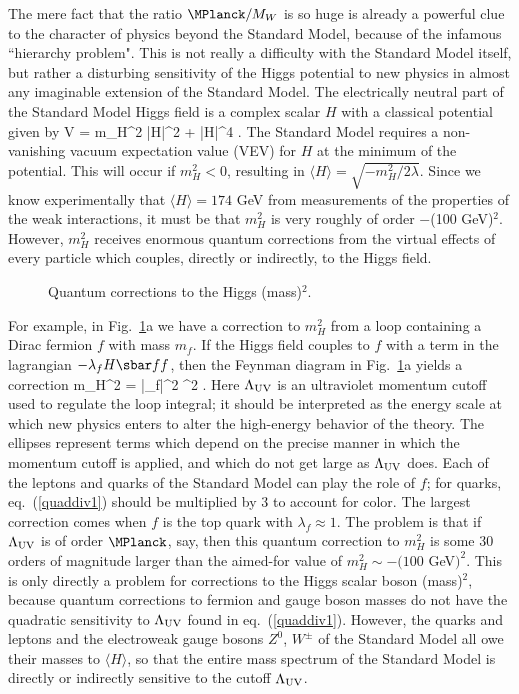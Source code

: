 The mere fact that the ratio $\MPlanck/M_W$ is so huge is
already a
powerful clue
to the
character of physics beyond the Standard Model, because of the infamous
``hierarchy problem".\cite{hierarchyproblem}
This is not really a difficulty
with the Standard Model itself, but rather a disturbing
sensitivity of the Higgs potential to new physics
in almost any imaginable extension of the Standard Model.
The electrically neutral part of the Standard Model Higgs field
is a complex scalar $H$ with a classical potential given by
\beq
V = m_H^2 |H|^2 + {\lambda} |H|^4\> .
\label{higgspotential}
\eeq
The Standard Model requires a non-vanishing vacuum expectation value
(VEV) for $H$
at the minimum of the potential.
This will occur if $m_H^2 < 0$, resulting in $\langle H \rangle
= \sqrt{-m_H^2/2\lambda}$. Since we know experimentally that
$\langle H \rangle 
= 174$ GeV from measurements of the properties of the weak interactions,
it must be that $m_H^2$ is very roughly of order $-$(100 GeV)$^2$.
However,
$m_H^2$ receives enormous quantum corrections from the virtual effects
of every particle which couples, directly or indirectly, to the Higgs field.

\begin{figure}
\centerline{}
\caption{Quantum corrections to the Higgs (mass)$^2$.
\label{fig:higgscorr1}}
\end{figure}
For example, in Fig.~\ref{fig:higgscorr1}a
we have a correction to $m_H^2$ from
a loop containing a Dirac fermion $f$ with mass $m_f$. If
the Higgs field couples to $f$
with a term in the lagrangian $-\lambda_f H \sbar f f$,
then the Feynman diagram in Fig.~\ref{fig:higgscorr1}a  yields a
correction
\beq
\Delta m_H^2 =  {|\lambda_f|^2 \pi^2}
.
\label{quaddiv1}
\eeq
Here $\Lambda_{\rm UV}$ is an ultraviolet
momentum cutoff used to regulate the
loop integral; it should be interpreted
as the energy scale at which new physics
enters to alter the high-energy behavior of the theory.
The ellipses represent terms which depend on the precise manner in which
the momentum cutoff is applied, and which do
not get large as $\Lambda_{\rm UV}$ does.
Each of the leptons and quarks of the
Standard Model can play the role of $f$; for quarks, eq.~(\ref{quaddiv1})
should be multiplied by 3 to account for color.
The largest correction comes when $f$ is the top quark
with $\lambda_f\approx 1$. The problem is that if $\Lambda_{\rm UV}$
is of order $\MPlanck$, say, then this quantum correction to $m_H^2$
is some 30 orders of magnitude larger than the aimed-for value of
$m_H^2 \sim -(100$ GeV$)^2$.
This is only directly a problem for corrections to the
Higgs scalar boson (mass)$^2$, because quantum
corrections to fermion and gauge boson masses do not have the quadratic
sensitivity to $\Lambda_{\rm UV}$ found in eq.~(\ref{quaddiv1}).
However, the quarks and leptons and the electroweak
gauge bosons $Z^0$, $W^\pm$
of the Standard Model all owe their masses to
$\langle H \rangle$, so that the entire mass spectrum of the
Standard Model is directly or indirectly sensitive to the cutoff
$\Lambda_{\rm UV}$.

